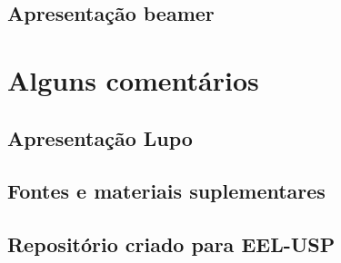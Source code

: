 \documentclass[11pt]{article}
\begin{document}
\subsection{Apresentação beamer}
\label{sec:org12ec654}
\section{Alguns comentários}
\label{sec:orgc511f67}
\subsection{Apresentação Lupo}
\label{sec:org7d201cf}
\subsection{Fontes e materiais suplementares}
\label{sec:org0dfac84}
\subsection{Repositório criado para EEL-USP}
\label{sec:org9fec61f}
\end{document}
